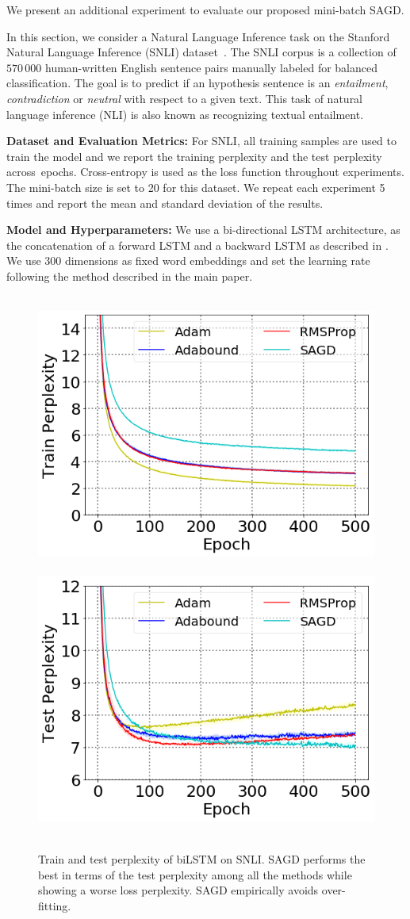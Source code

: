 We present an additional experiment to evaluate our proposed mini-batch \textsc{SAGD}.

In this section, we consider a Natural Language Inference task on the Stanford Natural Language Inference (SNLI) dataset~\citep{bowman2015large}. 
The SNLI corpus is a collection of $570 \, 000$ human-written English sentence pairs manually labeled for balanced classification.
The goal is to predict if an hypothesis sentence is an \emph{entailment}, \emph{contradiction} or \emph{neutral} with respect to a given text.
This task of natural language inference (NLI) is also known as recognizing textual entailment. 

\textbf{Dataset and Evaluation Metrics:} 
For SNLI, all training samples are used to train the model and we report the training perplexity and the test perplexity across~epochs. 
Cross-entropy is used as the loss function throughout experiments. 
The mini-batch size is set to 20 for this dataset. 
We repeat each experiment 5 times and report the mean and standard deviation of the results.



\textbf{Model and Hyperparameters:} 
We use a bi-directional LSTM architecture, as the concatenation of a forward LSTM and a backward LSTM as described in \citep{conneau2017supervised}.
We use 300 dimensions as fixed word embeddings and set the learning rate following the method described in the main paper.


\begin{figure}[H] 
 \mbox{
\includegraphics[width = 0.48 \textwidth ]{figure/bilstmtrain.png}
\includegraphics[width = 0.48 \textwidth ]{figure/bilstmtest.png}
 }
 \vspace{-0.1in}
 \caption[]{Train and test perplexity of biLSTM on SNLI. 
 \textsc{SAGD} performs the best in terms of the test perplexity among all the methods while showing a worse loss perplexity. SAGD empirically avoids over-fitting.
} 
 \label{fig:snli}\vspace{-0.05in}
\end{figure}

